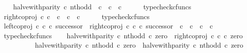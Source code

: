\begin{isabellebody}
\ \ \isamarkupfalse%
\ {\isachardoublequoteopen}halve{\isacharunderscore}{\kern0pt}with{\isacharunderscore}{\kern0pt}parity\ {\isasymcirc}\isactrlsub c\ nth{\isacharunderscore}{\kern0pt}odd\ {\isacharcolon}{\kern0pt}\ {\isasymnat}\isactrlsub c\ {\isasymrightarrow}\ {\isasymnat}\isactrlsub c\ {\isasymCoprod}\ {\isasymnat}\isactrlsub c{\isachardoublequoteclose}\isanewline
\ \ \ \ \isamarkupfalse%
\ typecheck{\isacharunderscore}{\kern0pt}cfuncs\isanewline
\ \ \isamarkupfalse%
\ {\isachardoublequoteopen}right{\isacharunderscore}{\kern0pt}coproj\ {\isasymnat}\isactrlsub c\ {\isasymnat}\isactrlsub c\ {\isacharcolon}{\kern0pt}\ {\isasymnat}\isactrlsub c\ {\isasymrightarrow}\ {\isasymnat}\isactrlsub c\ {\isasymCoprod}\ {\isasymnat}\isactrlsub c{\isachardoublequoteclose}\isanewline
\ \ \ \ \isamarkupfalse%
\ typecheck{\isacharunderscore}{\kern0pt}cfuncs\isanewline
\ \ \isamarkupfalse%
\ {\isachardoublequoteopen}{\isacharparenleft}{\kern0pt}left{\isacharunderscore}{\kern0pt}coproj\ {\isasymnat}\isactrlsub c\ {\isasymnat}\isactrlsub c\ {\isasymcirc}\isactrlsub c\ successor{\isacharparenright}{\kern0pt}\ {\isasymamalg}\ {\isacharparenleft}{\kern0pt}right{\isacharunderscore}{\kern0pt}coproj\ {\isasymnat}\isactrlsub c\ {\isasymnat}\isactrlsub c\ {\isasymcirc}\isactrlsub c\ successor{\isacharparenright}{\kern0pt}\ {\isacharcolon}{\kern0pt}\ {\isasymnat}\isactrlsub c\ {\isasymCoprod}\ {\isasymnat}\isactrlsub c\ {\isasymrightarrow}\ {\isasymnat}\isactrlsub c\ {\isasymCoprod}\ {\isasymnat}\isactrlsub c{\isachardoublequoteclose}\isanewline
\ \ \ \ \isamarkupfalse%
\ typecheck{\isacharunderscore}{\kern0pt}cfuncs\isanewline
\isanewline
\ \ \isamarkupfalse%
\ {\isachardoublequoteopen}{\isacharparenleft}{\kern0pt}halve{\isacharunderscore}{\kern0pt}with{\isacharunderscore}{\kern0pt}parity\ {\isasymcirc}\isactrlsub c\ nth{\isacharunderscore}{\kern0pt}odd{\isacharparenright}{\kern0pt}\ {\isasymcirc}\isactrlsub c\ zero\ {\isacharequal}{\kern0pt}\ right{\isacharunderscore}{\kern0pt}coproj\ {\isasymnat}\isactrlsub c\ {\isasymnat}\isactrlsub c\ {\isasymcirc}\isactrlsub c\ zero{\isachardoublequoteclose}\isanewline
\ \ \isamarkupfalse%
\ {\isacharminus}{\kern0pt}\isanewline
\ \ \ \ \isamarkupfalse%
\ {\isachardoublequoteopen}{\isacharparenleft}{\kern0pt}halve{\isacharunderscore}{\kern0pt}with{\isacharunderscore}{\kern0pt}parity\ {\isasymcirc}\isactrlsub c\ nth{\isacharunderscore}{\kern0pt}odd{\isacharparenright}{\kern0pt}\ {\isasymcirc}\isactrlsub c\ zero\ {\isacharequal}{\kern0pt}\ halve{\isacharunderscore}{\kern0pt}with{\isacharunderscore}{\kern0pt}parity\ {\isasymcirc}\isactrlsub c\ nth{\isacharunderscore}{\kern0pt}odd\ {\isasymcirc}\isactrlsub c\ zero{\isachardoublequoteclose}\isanewline

\end{isabellebody}
